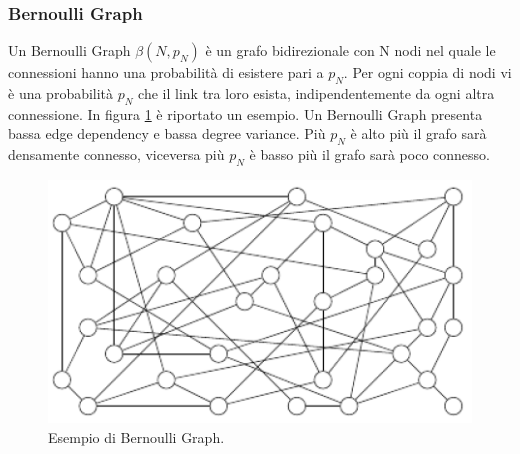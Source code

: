 \subsubsection{Bernoulli Graph}
Un Bernoulli Graph $\beta \mathit{\left( N,p_N \right)}$ è un grafo bidirezionale con N nodi nel quale le connessioni hanno una probabilità di esistere pari a $\mathit{p_N}$. Per ogni coppia di nodi vi è una probabilità $\mathit{p_N}$ che il link tra loro esista, indipendentemente da ogni altra connessione. In figura \ref{fig:bernoulli_graph} è riportato un esempio. Un Bernoulli Graph presenta bassa edge dependency e bassa degree variance. Più $\mathit{p_N}$ è alto più il grafo sarà densamente connesso, viceversa più $\mathit{p_N}$ è basso più il grafo sarà poco connesso.
\bigskip
\begin{figure}[h]
	\centering
	\includegraphics[width=0.7\linewidth,keepaspectratio]{Images/reti/bernoulli_graph}
	\caption[Bernoulli Graph]{Esempio di Bernoulli Graph\cite{comparisonGAonRT2014-ita}.}
	\label{fig:bernoulli_graph}
\end{figure}
\bigskip

